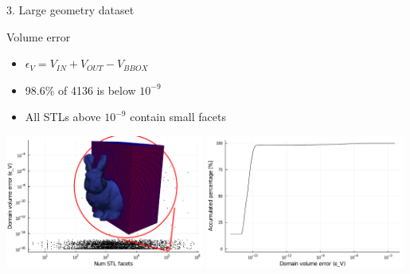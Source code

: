\documentclass{beamer}
\begin{document}
\begin{frame}{3. Large geometry dataset}

  \begin{block}{Volume error}
  \begin{itemize}
    \item
      $\epsilon_V = V_{IN} + V_{OUT} - V_{BBOX}$
    \item
      98.6\% of 4136 is below $10^{-9}$
    \item
      All STLs above $10^{-9}$ contain small facets
  \end{itemize}
  \end{block}

  \includegraphics[width=0.49\textwidth]{num_stl_facets_volume_error_bunny}
  \includegraphics[width=0.49\textwidth]{../analysis/plots/histogram_volume_error}
\end{frame}
\end{document}
